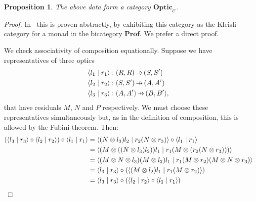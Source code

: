 \documentclass[11pt,letterpaper]{article}
\theoremstyle{plain}
\newtheorem{proposition}[theorem]{Proposition}
\theoremstyle{definition}
\newcommand{\C}{\mathscr{C}}
\newcommand{\Prof}{\mathbf{Prof}}
\newcommand{\Optic}{\mathbf{Optic}}
\newcommand{\rep}[2]{{\ensuremath \left\langle #1 \mid #2 \right\rangle}}
\newcommand{\hto}{\ensuremath{\,\mathaccent\shortmid\rightarrow\,}}
\begin{document}
\begin{proposition}\label{prop:optic-is-cat}
  The above data form a category $\Optic_\C$.
\end{proposition}
\begin{proof}
  In~\cite[Section 6]{Doubles} this is proven abstractly, by exhibiting this category as the Kleisli category for a monad in the bicategory $\Prof$. We prefer a direct proof.
  
  We check associativity of composition equationally.  Suppose we have representatives of three optics
\begin{align*}
  \rep{l_1}{r_1} &: (R, R) \hto (S, S') \\
  \rep{l_2}{r_2} &: (S, S') \hto (A, A') \\
  \rep{l_3}{r_3} &: (A, A') \hto (B, B'),
\end{align*}
that have residuals $M$, $N$ and $P$ respectively. We must choose these representatives simultaneously but, as in the definition of composition, this is allowed by the Fubini theorem. Then:
  \begin{align*}
    (\rep{l_3}{r_3} \circ \rep{l_2}{r_2}) \circ \rep{l_1}{r_1}
    &= \rep{(N \otimes l_3)l_2}{r_2(N \otimes r_3)} \circ \rep{l_1}{r_1} \\
    &= \rep{(M \otimes ((N \otimes l_3)l_2))l_1}{r_1(M \otimes (r_2(N \otimes r_3)))} \\
    &= \rep{(M \otimes N \otimes l_3)(M \otimes l_2)l_1}{r_1(M \otimes r_2)(M \otimes N \otimes r_3)} \\
    &= \rep{l_3}{r_3} \circ (\rep{(M \otimes l_2)l_1}{r_1(M \otimes r_2)}) \\
    &= \rep{l_3}{r_3} \circ (\rep{l_2}{r_2} \circ \rep{l_1}{r_1})
  \end{align*}


\end{proof}
\end{document}
